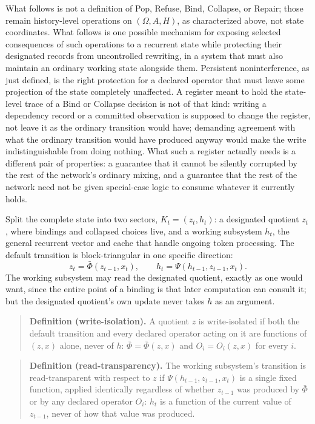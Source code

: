 \documentclass[11pt]{article}
\begin{document}
What follows is not a definition of Pop, Refuse, Bind, Collapse, or Repair; those remain history-level operations on $(\Omega, A, H)$, as characterized above, not state coordinates. What follows is one possible mechanism for exposing selected consequences of such operations to a recurrent state while protecting their designated records from uncontrolled rewriting, in a system that must also maintain an ordinary working state alongside them. Persistent noninterference, as just defined, is the right protection for a declared operator that must leave some projection of the state completely unaffected. A register meant to hold the state-level trace of a Bind or Collapse decision is not of that kind: writing a dependency record or a committed observation is supposed to change the register, not leave it as the ordinary transition would have; demanding agreement with what the ordinary transition would have produced anyway would make the write indistinguishable from doing nothing. What such a register actually needs is a different pair of properties: a guarantee that it cannot be silently corrupted by the rest of the network's ordinary mixing, and a guarantee that the rest of the network need not be given special-case logic to consume whatever it currently holds.

Split the complete state into two sectors, $K_t = (z_t, h_t)$: a designated quotient $z_t$, where bindings and collapsed choices live, and a working subsystem $h_t$, the general recurrent vector and cache that handle ongoing token processing. The default transition is block-triangular in one specific direction:
\[
z_t = \bar\Phi(z_{t-1}, x_t),
\qquad
h_t = \Psi(h_{t-1}, z_{t-1}, x_t).
\]
The working subsystem may read the designated quotient, exactly as one would want, since the entire point of a binding is that later computation can consult it; but the designated quotient's own update never takes $h$ as an argument.

\begin{quote}
\textbf{Definition (write-isolation).} A quotient $z$ is write-isolated if both the default transition and every declared operator acting on it are functions of $(z, x)$ alone, never of $h$: $\bar\Phi = \bar\Phi(z,x)$ and $O_i = O_i(z,x)$ for every $i$.
\end{quote}

\begin{quote}
\textbf{Definition (read-transparency).} The working subsystem's transition is read-transparent with respect to $z$ if $\Psi(h_{t-1}, z_{t-1}, x_t)$ is a single fixed function, applied identically regardless of whether $z_{t-1}$ was produced by $\bar\Phi$ or by any declared operator $O_i$: $h_t$ is a function of the current value of $z_{t-1}$, never of how that value was produced.
\end{quote}
\end{document}
